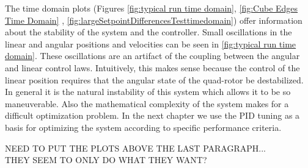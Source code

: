 The time domain plots (Figures     \ref{fig:typical run time domain},   \ref{fig:Cube Edges Time Domain}  , \ref{fig:largeSetpointDifferencesTesttimedomain}) offer information about the stability of the system and the controller. Small oscillations in the linear and angular positions and velocities can be seen in \ref{fig:typical run time domain}. These oscillations are an artifact of the coupling between the angular and linear control laws. Intuitively, this makes sense because the control of the linear position requires that the angular state of the quad-rotor be destabilized. In general it is the natural instability of this system which allows it to be so maneuverable. Also the mathematical complexity of the system makes for a difficult optimization problem. In the next chapter we use the PID tuning as a basis for optimizing the system according to specific performance criteria.



{\color{red}  NEED TO PUT THE PLOTS ABOVE THE LAST PARAGRAPH...\\THEY SEEM TO ONLY DO WHAT THEY WANT?  }




